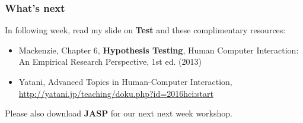 \documentclass{beamer}
\begin{document}

\begin{frame}
\frametitle{What's next}
In following week,  read my slide on \textbf{Test} and these complimentary resources:
	\begin{itemize}
		\item Mackenzie, Chapter 6, \textbf{Hypothesis Testing},  Human Computer Interaction: An Empirical Research Perspective, 1st ed. (2013) 
		\item Yatani, Advanced Topics in Human-Computer Interaction, \url{http://yatani.jp/teaching/doku.php?id=2016hci:start}
	\end{itemize}
Please also download \textbf{JASP} for our next next week workshop.
\end{frame}




%
%

\end{document}
